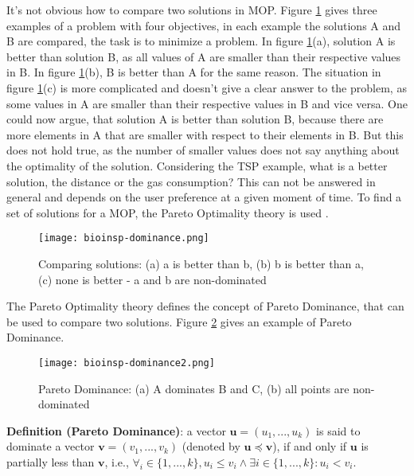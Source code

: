 It's not obvious how to compare two solutions in MOP. Figure \ref{fig:dominance} gives three examples of a problem with four objectives, in each example the solutions A and B are compared, the task is to minimize a problem. In figure \ref{fig:dominance}(a), solution A is better than solution B, as all values of A are smaller than their respective values in B. In figure \ref{fig:dominance}(b), B is better than A for the same reason. The situation in figure \ref{fig:dominance}(c) is more complicated and doesn't give a clear answer to the problem, as some values in A are smaller than their respective values in B and vice versa. One could now argue, that solution A is better than solution B, because there are more elements in A that are smaller with respect to their elements in B. But this does not hold true, as the number of smaller values does not say anything about the optimality of the solution. Considering the TSP example, what is a better solution, the distance or the gas consumption? This can not be answered in general and depends on the user preference at a given moment of time. To find a set of solutions for a MOP, the Pareto Optimality theory is used \cite{ehrgott2005multicriteria}.

\begin{figure}[ht!]
  \centering
  \texttt{[image: bioinsp-dominance.png]}
  \caption{Comparing solutions: (a) a is better than b, (b) b is better than a, (c) none is better - a and b are non-dominated}
  \label{fig:dominance}
\end{figure}

The Pareto Optimality theory defines the concept of Pareto Dominance, that can be used to compare two solutions. Figure \ref{fig:dominance2} gives an example of Pareto Dominance.

\begin{figure}[ht!]
  \centering
  \texttt{[image: bioinsp-dominance2.png]}
  \caption{Pareto Dominance: (a) A dominates B and C, (b) all points are non-dominated}
  \label{fig:dominance2}
\end{figure}

\noindent\textbf{Definition (Pareto Dominance)}: a vector $\mathbf{u} = (u_1,...,u_k)$ is said to dominate a vector $\mathbf{v} = (v_1,...,v_k)$ (denoted by $\mathbf{u} \preceq \mathbf{v}$), if and only if $\mathbf{u}$ is partially less than $\mathbf{v}$, i.e., $\forall_i \in \{1,...,k\}, u_i \leq v_i \land \exists i \in \{1,...,k\}: u_i < v_i$.

